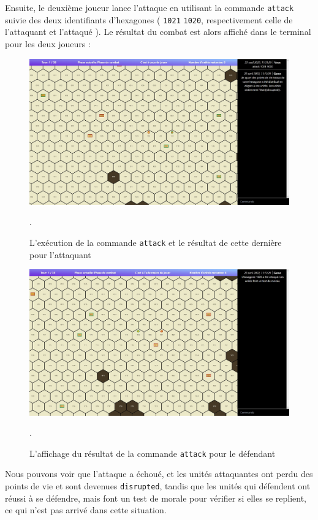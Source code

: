 Ensuite, le deuxième joueur lance l'attaque en utilisant la commande {\tt attack} suivie des deux identifiants d'hexagones ( {\tt 1021} {\tt 1020}, respectivement celle de l'attaquant et l'attaqué ). Le résultat du combat est alors affiché dans le terminal pour les deux joueurs : \\

\begin{figure}[H]
    \centering
    \includegraphics[scale=0.35]{data/Attacker.jpg}
    \caption{ L'exécution de la commande {\tt attack} et le résultat de cette dernière pour l'attaquant }.
\end{figure}

\begin{figure}[H]
    \centering
    \includegraphics[scale=0.35]{data/Defender.jpg}
    \caption{L'affichage du résultat de la commande {\tt attack} pour le défendant }.
\end{figure}

Nous pouvons voir que l'attaque a échoué, et les unités attaquantes ont perdu des points de vie et sont devenues {\tt disrupted}, tandis que les unités qui défendent ont réussi à se défendre, mais font un test de morale pour vérifier si elles se replient, ce qui n'est pas arrivé dans cette situation.



